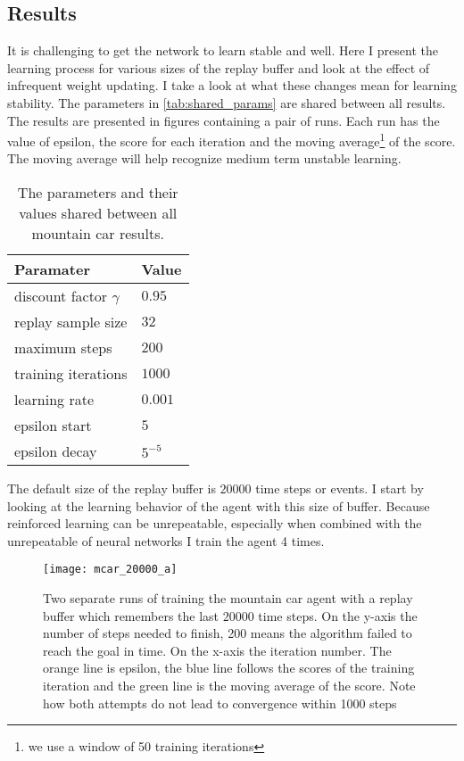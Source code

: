\clearpage
\subsection{Results}

It is challenging to get the network to learn stable and well. Here I present the learning process for various sizes of the replay buffer and look at the effect of infrequent weight updating. I take a look at what these changes mean for learning stability. The parameters in \autoref{tab:shared_params} are shared between all results. The results are presented in figures containing a pair of runs. Each run has the value of epsilon, the score for each iteration and the moving average\footnote{we use a window of 50 training iterations} of the score. The moving average will help recognize medium term unstable learning.

\begin{table}[ht]
  \centering
  \selectfont
  \begin{tabular}{ll}
    \toprule
    Paramater & Value \\
    \midrule
    discount factor $\gamma$ & $0.95$ \\
    replay sample size & $32$ \\
    maximum steps & $200$ \\
    training iterations & $1000$ \\
    learning rate & $0.001$ \\
    epsilon start & $5$ \\
    epsilon decay & $5^{-5}$ \\
    \bottomrule
  \end{tabular}
  \caption{The parameters and their values shared between all mountain car results.}
  \label{tab:shared_params}
\end{table}

The default size of the replay buffer is $20000$ time steps or events. I start by looking at the learning behavior of the agent with this size of buffer. Because reinforced learning can be unrepeatable, especially when combined with the unrepeatable of neural networks I train the agent 4 times. 

\begin{figure}
    \texttt{[image: mcar\_20000\_a]}
    \caption{Two separate runs of training the mountain car agent with a replay buffer which remembers the last $20000$ time steps. On the y-axis the number of steps needed to finish, 200 means the algorithm failed to reach the goal in time. On the x-axis the iteration number. The orange line is epsilon, the blue line follows the scores of the training iteration and the green line is the moving average of the score. Note how both attempts do not lead to convergence within 1000 steps}
    \label{fig:mcar_20k_a}
\end{figure}

